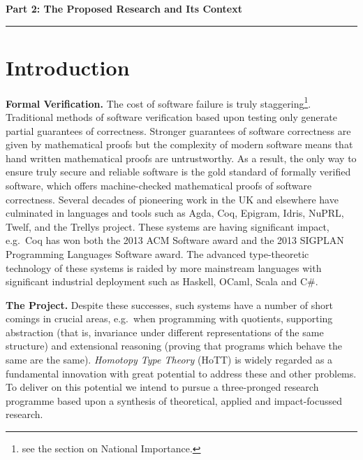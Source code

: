 \documentclass[a4paper,11pt]{article}
\newcommand{\eg}{{e.g.}\ }
\begin{document}
\newpage

\noindent
{\bf \Large Part 2: The Proposed Research and Its Context}

\vspace*{-0.23in}

\begin{center}
\rule{170mm}{.5mm}
\end{center}

\vspace*{-0.4in}

\section{Introduction}\label{sec:intro}

\vspace*{-0.1in}

{\bf Formal Verification.} The cost of software failure is truly
staggering\footnote{see the section on National
  Importance.}. Traditional methods of software verification based
upon testing only generate partial guarantees of correctness. Stronger
guarantees of software correctness are given by mathematical proofs
but the complexity of modern software means that hand written
mathematical proofs are untrustworthy. As a result, the only way to
ensure truly secure and reliable software is the gold standard of
formally verified software, which offers machine-checked mathematical
proofs of software correctness. Several decades of pioneering work in
the UK and elsewhere have culminated in languages and tools
such as Agda, Coq, Epigram, Idris, NuPRL, Twelf, and
the Trellys project. These systems are having significant impact,
\eg Coq has won both the 2013 ACM Software award and the 2013 SIGPLAN
Programming Languages Software award. The advanced type-theoretic
technology of these systems is raided by more mainstream languages
with significant industrial deployment such as Haskell, OCaml, Scala
and C\#.

{\bf The Project.} Despite these successes, such systems have a number
of short comings in crucial areas, \eg when programming with quotients,
supporting abstraction (that is, invariance under different
representations of the same structure) and extensional reasoning
(proving that programs which behave the same are the same).  {\em
  Homotopy Type Theory} (HoTT) is widely regarded as a fundamental
innovation with great potential to address these and other problems.
To deliver on this potential we intend to pursue
a three-pronged research programme based upon a synthesis of
theoretical, applied and impact-focussed research.
\end{document}
